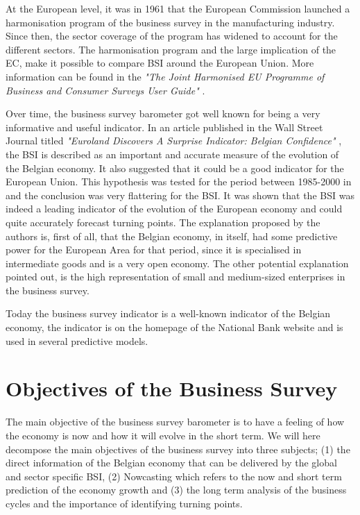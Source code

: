 \documentclass[12pt,a4paper,oneside]{book}
\begin{document}
At the European level, it was in 1961 that the European Commission launched a harmonisation program of the business survey in the manufacturing industry. 
Since then, the sector coverage of the program has widened to account for the different sectors.
The harmonisation program and the large implication of the EC, make it possible to compare BSI around the European Union.
More information can be found in the \textit{"The Joint Harmonised EU Programme of Business and Consumer Surveys User Guide"} \cite{european_commission_joint_2016}.

Over time, the business survey barometer got well known for being a very informative and useful indicator. 
In an article published in the Wall Street Journal titled \textit{"Euroland Discovers A Surprise Indicator: Belgian Confidence"} \citep{rhoads_euroland_1999}, the BSI is described as an important and accurate measure of the evolution of the Belgian economy. 
It also suggested that it could be a good indicator for the European Union. 
This hypothesis was tested for the period between 1985-2000 in \cite{vanhaelen_belgian_2000} and the conclusion was very flattering for the BSI. 
It was shown that the BSI was indeed a leading indicator of the evolution of the European economy and could quite accurately forecast turning points. 
The explanation proposed by the authors is, first of all, that the Belgian economy, in itself, had some predictive power for the European Area for that period, since it is specialised in intermediate goods and is a very open economy. 
The other potential explanation pointed out, is the high representation of small and medium-sized enterprises in the business survey.

Today the business survey indicator is a well-known indicator of the Belgian economy, the indicator is on the homepage of the National Bank website and is used in several predictive models.



\section{Objectives of the Business Survey}
\label{section:Objective}


The main objective of the business survey barometer is to have a feeling of how the economy is now and how it will evolve in the short term.
We will here decompose the main objectives of the business survey into three subjects; (1) the direct information of the Belgian economy that can be delivered by the global and sector specific BSI, (2) Nowcasting which refers to the now and short term prediction of the economy growth and (3) the long term analysis of the business cycles and the importance of identifying turning points.
\end{document}
